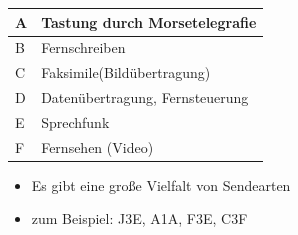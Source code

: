 \begin{frame}
\begin{tiny}
\begin{minipage}{0.4\textwidth}
\begin{tabular}{|l|l|}
        \hline
        A & Tastung durch Morsetelegrafie\\ \hline
        B & Fernschreiben \\ \hline
        C & Faksimile(Bildübertragung)\\ \hline
        D & Datenübertragung, Fernsteuerung\\ \hline
        E & Sprechfunk \\ \hline
        F & Fernsehen (Video)\\ \hline
      \end{tabular}
    \end{minipage}
  \end{tiny}
  \vspace{0.5cm}
  \begin{itemize}
    \item Es gibt eine große Vielfalt von Sendearten
    \item zum Beispiel: J3E, A1A, F3E, C3F
  \end{itemize}
\end{frame}


